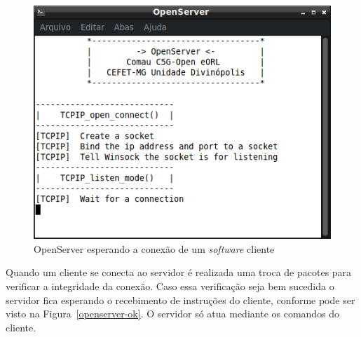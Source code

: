         \begin{figure}[ht]
            \centering
            \includegraphics[width=\columnwidth]{imagens/Softwares/openserver-wait_.png}
            \small 
            \centering 
            \caption{OpenServer esperando a conexão de um \textit{software} cliente}
            \label{openserver-wait}
        \end{figure}
        
        Quando um cliente se conecta ao servidor é realizada uma troca de pacotes para verificar a integridade da conexão. Caso essa verificação seja bem sucedida o servidor fica esperando o recebimento de instruções do cliente, conforme pode ser visto na Figura~\ref{openserver-ok}. O servidor só atua mediante os comandos do cliente.
        
